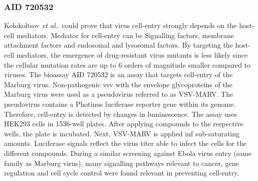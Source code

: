 \subsubsection{AID 720532}
Kolokoltsov \textit{et al.}.\cite{Kolokoltsov2007} could prove that virus cell-entry strongly depends on the host-cell mediators. Mediator for cell-entry can be Signalling factors, membrane attachment factors and endosomal and lysosomal factors.\cite{HofmannWinkler2012} By targeting the host-cell mediators, the emergence of drug-resistant virus mutants is less likely since the cellular mutation rates are up to 6 orders of magnitude smaller compared to viruses.\cite{Kolokoltsov2009} The bioassay AID 720532 is an assay that targets cell-entry of the Marburg virus. Non-pathogenic \ac{vsv} with the envelope glycoproteins of the Marburg virus were used as a pseudovirus referred to as VSV-MARV. The pseudovirus contains a Photinus luciferase reporter gene within its genome. Therefore, cell-entry is detected by changes in luminescence. The assay uses HEK293 cells in 1536-well plates. After applying compounds to the respective wells, the plate is incubated. Next, VSV-MARV is applied inf sub-saturating amounts. Luciferase signals reflect the virus titer able to infect the cells for the different compounds.\cite{AID720532}\cite{Kim2020} During a similar screening against Ebola virus entry (same family as Marburg virus), many signalling pathways relevant to cancer, gene regulation and cell cycle control were found relevant in preventing cell-entry.\cite{Kolokoltsov2009}
%
%
%
